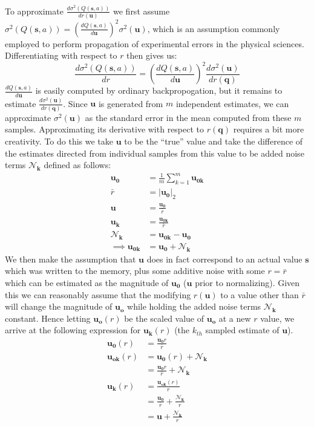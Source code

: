 \documentclass{article}
\begin{document}
To approximate $\frac{d\sigma^2(Q(\pmb{s},a))}{dr(\pmb{u})}$ we first assume $\sigma^2(Q(\pmb{s},a)) = \left(\frac{dQ(\pmb{s},a)}{d\pmb{u}}\right)^2\sigma^2(\pmb{u})$, which is an assumption commonly employed to perform propagation of experimental errors in the physical sciences. Differentiating with respect to $r$ then gives us: 
$$\frac{d\sigma^2(Q(\pmb{s},a))}{dr} = \left(\frac{dQ(\pmb{s},a)}{d\pmb{u}}\right)^2\frac{d\sigma^2(\pmb{u})}{dr(\pmb{q})}$$
$\frac{dQ(\pmb{s},a)}{d\pmb{u}}$ is easily computed by ordinary backpropogation, but it remains to estimate $\frac{d\sigma^2(\pmb{u})}{dr(\pmb{q})}$. Since $\pmb{u}$ is generated from $m$ independent estimates, we can approximate $\sigma^2(\pmb{u})$ as the standard error in the mean computed from these $m$ samples. Approximating its derivative with respect to $r(\pmb{q})$ requires a bit more creativity. To do this we take $\pmb{u}$ to be the ``true'' value and take the difference of the estimates directed from individual samples from this value to be added noise terms $\pmb{\mathcal{N}_k}$ defined as follows:
\begin{align*}
\pmb{u_0}&=\frac{1}{m}\sum_{k=1}^m\pmb{u_{0k}}\\
\bar{r}&=|\pmb{u_0}|_2\\
\pmb{u}&=\frac{\pmb{u_0}}{\bar{r}}\\
\pmb{u_k} &= \frac{\pmb{u_{0k}}}{\bar{r}}\\
\pmb{\mathcal{N}_k}&=\pmb{u_{0k}}-\pmb{u_0}\\
\implies\pmb{u_{0k}}&=\pmb{u_0}+\pmb{\mathcal{N}_k}
\end{align*}
We then make the assumption that $\pmb{u}$ does in fact correspond to an actual value $\pmb{s}$ which was written to the memory, plus some additive noise with some $r=\bar{r}$ which can be estimated as the magnitude of $\pmb{u_0}$ ($\pmb{u}$ prior to normalizing). Given this we can reasonably assume that the modifying $r(\pmb{u})$ to a value other than $\bar{r}$ will change the magnitude of $\pmb{u_o}$ while holding the added noise terms $\pmb{\mathcal{N}_k}$ constant. Hence letting $\pmb{u_o}(r)$ be the scaled value of $\pmb{u_o}$ at a new $r$ value, we arrive at the following expression for $\pmb{u_k}(r)$ (the $k_{th}$ sampled estimate of $\pmb{u}$).
\begin{align*}
\pmb{u_0}(r) &= \frac{\pmb{u_0}r}{\bar{r}}\\
\pmb{u_{ok}}(r) &= \pmb{u_0}(r)+\pmb{\mathcal{N}_k}\\
&=\frac{\pmb{u_0}r}{\bar{r}}+\pmb{\mathcal{N}_k}\\
\pmb{u_k}(r) &= \frac{\pmb{u_{ok}}(r)}{r}\\
&= \frac{\pmb{u_0}}{\bar{r}}+\frac{\pmb{\mathcal{N}_k}}{r}\\
&=\pmb{u}+\frac{\pmb{\mathcal{N}_k}}{r}
\end{align*}
\end{document}
